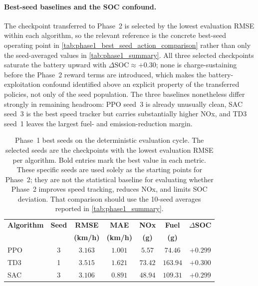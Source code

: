 \paragraph{Best-seed baselines and the \ac{SOC} confound.}
The checkpoint transferred to Phase~2 is selected by the lowest evaluation \ac{RMSE} within each algorithm, so the relevant reference is the concrete best-seed operating point in \autoref{tab:phase1_best_seed_action_comparison} rather than only the seed-averaged values in \autoref{tab:phase1_summary}. All three selected checkpoints saturate the battery upward with $\Delta\text{SOC}\approx+0.30$; none is charge-sustaining before the Phase~2 reward terms are introduced, which makes the battery-exploitation confound identified above an explicit property of the transferred policies, not only of the seed population. The three baselines nonetheless differ strongly in remaining headroom: PPO seed~3 is already unusually clean, SAC seed~3 is the best speed tracker but carries substantially higher \ac{NOx}, and TD3 seed~1 leaves the largest fuel- and emission-reduction margin.

\begin{table}[H]
  \centering
  \small
  \begin{tabular}{lcccccc}
    \hline
    \textbf{Algorithm} & \textbf{Seed} & \textbf{RMSE} & \textbf{MAE} & \textbf{\ac{NOx}} & \textbf{Fuel} & \textbf{$\Delta$\ac{SOC}} \\
    & & \textbf{(km/h)} & \textbf{(km/h)} & \textbf{(g)} & \textbf{(g)} & \\
    \hline
    PPO & 3 & $3.163$ & $1.001$ & $\mathbf{5.57}$ & $\mathbf{74.46}$ & $+0.299$ \\
    TD3 & 1 & $3.515$ & $1.621$ & $73.42$ & $163.94$ & $+0.300$ \\
    SAC & 3 & $\mathbf{3.106}$ & $\mathbf{0.891}$ & $48.94$ & $109.31$ & $+0.299$ \\
    \hline
  \end{tabular}
  \caption[Phase~1 best-seed comparison]{Phase~1 best seeds on the deterministic evaluation cycle. The selected seeds are the checkpoints with the lowest evaluation \ac{RMSE} per algorithm. Bold entries mark the best value in each metric. These specific seeds are used solely as the starting points for Phase~2; they are not the statistical baseline for evaluating whether Phase~2 improves speed tracking, reduces \ac{NOx}, and limits \ac{SOC} deviation. That comparison should use the 10-seed averages reported in \autoref{tab:phase1_summary}.}
  \label{tab:phase1_best_seed_action_comparison}
\end{table}

